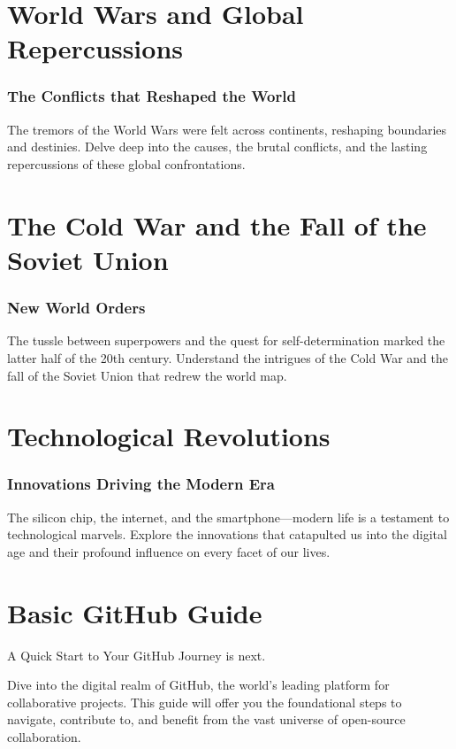 \documentclass[a4paper,12pt]{book}
\begin{document}
\chapter{World Wars and Global Repercussions}
\subsection*{The Conflicts that Reshaped the World}
The tremors of the World Wars were felt across continents, reshaping boundaries and destinies. Delve deep into the causes, the brutal conflicts, and the lasting repercussions of these global confrontations.

\chapter{The Cold War and the Fall of the Soviet Union}
\subsection*{New World Orders}
The tussle between superpowers and the quest for self-determination marked the latter half of the 20th century. Understand the intrigues of the Cold War and the fall of the Soviet Union that redrew the world map.

\chapter{Technological Revolutions}
\subsection*{Innovations Driving the Modern Era}
The silicon chip, the internet, and the smartphone—modern life is a testament to technological marvels. Explore the innovations that catapulted us into the digital age and their profound influence on every facet of our lives.



\appendix
\chapter{Basic GitHub Guide}
A Quick Start to Your GitHub Journey is next.

Dive into the digital realm of GitHub, the world's leading platform for collaborative projects. This guide will offer you the foundational steps to navigate, contribute to, and benefit from the vast universe of open-source collaboration.
\end{document}
